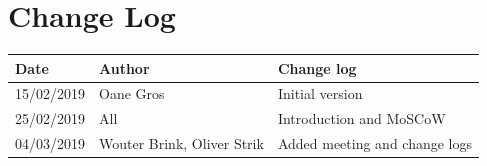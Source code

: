 \documentclass{article}
\begin{document}
\section{Change Log}
\begin{center}
 \begin{tabular}{ | l | l | l | }
  \hline
  \bf{Date} & \bf{Author} & \bf{Change log} \\
  \hline
  15/02/2019 & Oane Gros & Initial version \\
  \hline
  25/02/2019 & All & Introduction and MoSCoW \\
  \hline
  04/03/2019 & Wouter Brink, Oliver Strik & Added meeting and change logs\\
  \hline
 \end{tabular}
\end{center}
\end{document}
